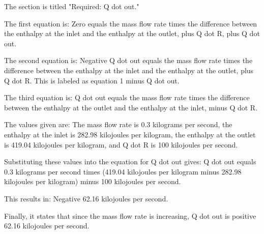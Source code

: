 The section is titled "Required: Q dot out."

The first equation is:
Zero equals the mass flow rate times the difference between the enthalpy at the inlet and the enthalpy at the outlet, plus Q dot R, plus Q dot out.

The second equation is:
Negative Q dot out equals the mass flow rate times the difference between the enthalpy at the inlet and the enthalpy at the outlet, plus Q dot R. This is labeled as equation 1 minus Q dot out.

The third equation is:
Q dot out equals the mass flow rate times the difference between the enthalpy at the outlet and the enthalpy at the inlet, minus Q dot R.

The values given are:
The mass flow rate is 0.3 kilograms per second, the enthalpy at the inlet is 282.98 kilojoules per kilogram, the enthalpy at the outlet is 419.04 kilojoules per kilogram, and Q dot R is 100 kilojoules per second.

Substituting these values into the equation for Q dot out gives:
Q dot out equals 0.3 kilograms per second times (419.04 kilojoules per kilogram minus 282.98 kilojoules per kilogram) minus 100 kilojoules per second.

This results in:
Negative 62.16 kilojoules per second.

Finally, it states that since the mass flow rate is increasing, Q dot out is positive 62.16 kilojoules per second.